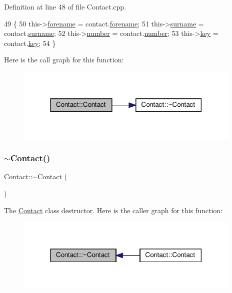 Definition at line 48 of file Contact.\+cpp.


\begin{DoxyCode}
49 \{
50     this->\hyperlink{class_contact_af64e25f3271abad7970293e6adfdf457}{forename} = contact.\hyperlink{class_contact_af64e25f3271abad7970293e6adfdf457}{forename};
51     this->\hyperlink{class_contact_a22518b332de3bd09ed94eb4d9de54894}{surname} = contact.\hyperlink{class_contact_a22518b332de3bd09ed94eb4d9de54894}{surname};
52     this->\hyperlink{class_contact_abd24eed27b661da4ab20553443212437}{number} = contact.\hyperlink{class_contact_abd24eed27b661da4ab20553443212437}{number};
53     this->\hyperlink{class_contact_a5bc7925e6356e29c9cbad7266f0a4340}{key} = contact.\hyperlink{class_contact_a5bc7925e6356e29c9cbad7266f0a4340}{key};
54 \}
\end{DoxyCode}
Here is the call graph for this function\+:\nopagebreak
\begin{figure}[H]
\begin{center}
\leavevmode
\includegraphics[width=306pt]{dd/d2a/class_contact_a9657abb8a68839149c8d928b4c16a82c_cgraph}
\end{center}
\end{figure}
\mbox{\label{class_contact_ab68013cc59e3d640735c573e52c35219}} 
\subsubsection{\texorpdfstring{$\sim$\+Contact()}{~Contact()}}
{\footnotesize\ttfamily Contact\+::$\sim$\+Contact (\begin{DoxyParamCaption}{ }\end{DoxyParamCaption})\hspace{0.3cm}{\ttfamily [default]}}

The \hyperlink{class_contact}{Contact} class destructor. Here is the caller graph for this function\+:\nopagebreak
\begin{figure}[H]
\begin{center}
\leavevmode
\includegraphics[width=306pt]{dd/d2a/class_contact_ab68013cc59e3d640735c573e52c35219_icgraph}
\end{center}
\end{figure}


